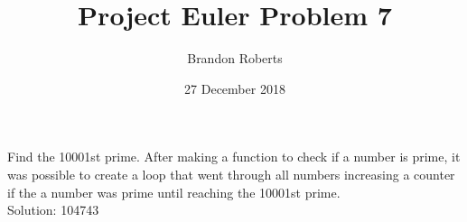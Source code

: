 \documentclass{article}
\begin{document}
\title{Project Euler Problem 7}
\author{Brandon Roberts}
\date{27 December 2018}

\maketitle

Find the 10001st prime.
After making a function to check if a number is prime, it was possible to create a loop that went through all numbers increasing a counter if the a number was prime until reaching the 10001st prime.\\
Solution: 104743
\end{document}
